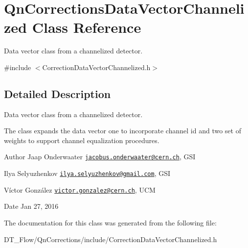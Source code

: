 \hypertarget{classQnCorrectionsDataVectorChannelized}{}\section{Qn\+Corrections\+Data\+Vector\+Channelized Class Reference}
\label{classQnCorrectionsDataVectorChannelized}


Data vector class from a channelized detector.  




{\ttfamily \#include $<$Correction\+Data\+Vector\+Channelized.\+h$>$}



\subsection{Detailed Description}
Data vector class from a channelized detector. 

The class expands the data vector one to incorporate channel id and two set of weights to support channel equalization procedures.

\begin{DoxyAuthor}{Author}
Jaap Onderwaater \href{mailto:jacobus.onderwaater@cern.ch}{\tt jacobus.\+onderwaater@cern.\+ch}, G\+SI 

Ilya Selyuzhenkov \href{mailto:ilya.selyuzhenkov@gmail.com}{\tt ilya.\+selyuzhenkov@gmail.\+com}, G\+SI 

Víctor González \href{mailto:victor.gonzalez@cern.ch}{\tt victor.\+gonzalez@cern.\+ch}, U\+CM 
\end{DoxyAuthor}
\begin{DoxyDate}{Date}
Jan 27, 2016 
\end{DoxyDate}


The documentation for this class was generated from the following file\+:\begin{DoxyCompactItemize}
\item 
D\+T\+\_\+\+Flow/\+Qn\+Corrections/include/Correction\+Data\+Vector\+Channelized.\+h\end{DoxyCompactItemize}
